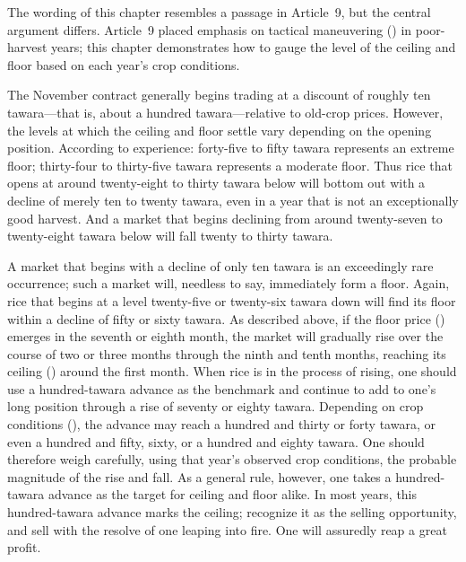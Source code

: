 \commentary
The wording of this chapter resembles a passage in Article~9, but the
central argument differs. Article~9 placed emphasis on tactical maneuvering
() in poor-harvest years; this chapter demonstrates how
to gauge the level of the ceiling and floor based on each year's crop
conditions.

The November contract generally begins trading at a discount of roughly ten
tawara---that is, about a hundred tawara---relative to old-crop prices.
However, the levels at which the ceiling and floor settle vary depending on
the opening position. According to experience: forty-five to fifty tawara
represents an extreme floor; thirty-four to thirty-five tawara represents a
moderate floor. Thus rice that opens at around twenty-eight to thirty
tawara below will bottom out with a decline of merely ten to twenty
tawara, even in a year that is not an exceptionally good harvest. And a
market that begins declining from around twenty-seven to twenty-eight
tawara below will fall twenty to thirty tawara.

A market that begins with a decline of only ten tawara is an exceedingly
rare occurrence; such a market will, needless to say, immediately form a
floor. Again, rice that begins at a level twenty-five or twenty-six tawara
down will find its floor within a decline of fifty or sixty tawara. As
described above, if the floor price () emerges in
the seventh or eighth month, the market will gradually rise over the
course of two or three months through the ninth and tenth months, reaching
its ceiling () around the first month. When rice is in
the process of rising, one should use a hundred-tawara advance as the
benchmark and continue to add to one's long position through a rise of
seventy or eighty tawara. Depending on crop conditions (),
the advance may reach a hundred and thirty or forty tawara, or even a
hundred and fifty, sixty, or a hundred and eighty tawara. One should
therefore weigh carefully, using that year's observed crop conditions, the
probable magnitude of the rise and fall. As a general rule, however, one
takes a hundred-tawara advance as the target for ceiling and floor alike.
In most years, this hundred-tawara advance marks the ceiling; recognize it
as the selling opportunity, and sell with the resolve of one leaping into
fire. One will assuredly reap a great profit.

